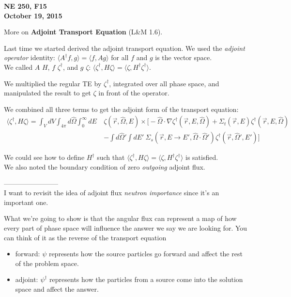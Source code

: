 \documentclass[12pt]{article}
\newcommand{\rvec}{\ensuremath{\vec{r}}}
\newcommand{\vOmega}{\ensuremath{\hat{\Omega}}}
\begin{document}
\begin{center}
{\bf NE 250, F15\\
October 19, 2015 
}
\end{center}

More on \textbf{Adjoint Transport Equation} (L\&M 1.6).

Last time we started derived the adjoint transport equation. We used the \textit{adjoint operator} identity: $\langle A^{\dagger}f, g\rangle = \langle f, Ag\rangle$ for all $f$ and $g$ is the vector space. \\
We called $A$ $H$, $f$ $\zeta^{\dagger}$, and $g$ $\zeta$: $\langle\zeta^{\dagger}, H \zeta\rangle = \langle\zeta, H^{\dagger} \zeta^{\dagger}\rangle$.

We multiplied the regular TE by $\zeta^{\dagger}$, integrated over all phase space, and manipulated the result to get $\zeta$ in front of the operator.

We combined all three terms to get the adjoint form of the transport equation:
\begin{align*}
\langle\zeta^{\dagger}, H \zeta\rangle = \int_{V} dV \int_{4\pi} d\vOmega \int_0^{\infty} dE \: &\zeta (\rvec, \vOmega, E) \times \biggl[-\vOmega \cdot \nabla \zeta^{\dagger}(\vec{r}, E, \vOmega)  + \Sigma_t(\rvec,E) \zeta^{\dagger}(\vec{r}, E, \vOmega) \\&- \int d\vOmega' \int dE'\: \Sigma_s(\rvec, E \rightarrow E', \vOmega \cdot \vOmega') \zeta^{\dagger}(\rvec, \vOmega', E') \biggr]
\end{align*}

We could see how to define $H^{\dagger}$ such that $\langle\zeta^{\dagger}, H \zeta\rangle = \langle\zeta, H^{\dagger} \zeta^{\dagger}\rangle$ is satisfied.\\
We also noted the boundary condition of zero \textit{outgoing} adjoint flux.

------------------------\\
I want to revisit the idea of adjoint flux \textit{neutron importance} since it's an important one. 

What we're going to show is that the angular flux can represent a map of how every part of phase space will influence the answer we say we are looking for. You can think of it as the reverse of the transport equation 
\begin{itemize}
\item forward: $\psi$ represents how the source particles go forward and affect the rest of the problem space.
\item adjoint: $\psi^{\dagger}$ represents how the particles from a source come into the solution space and affect the answer. 
\end{itemize}
\end{document}
